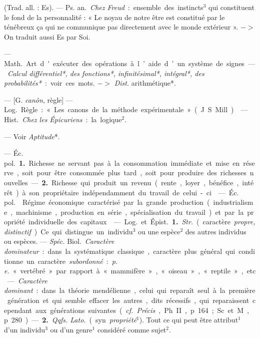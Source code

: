 
	\begin{itemize}[leftmargin=1cm, label=, itemsep=11pt]

 (Trad. all. : Es). — \si{Ps. an.} {\it Chez
Freud} : ensemble des instincts$^3$ qui
constituent le fond de la personnalité :
« Le noyau de notre être est constitué
par le ténébreux ça qui ne communique pas directement avec le
monde extérieur ». $->$ On traduit
aussi Es par Soi.

 — \si{Math.} Art d'exécuter des
opérations à l’aide d’un système de
signes. — {\it Calcul différentiel*, des
fonctions*, infinitésimal*, intégral*,
des probabilités*} : voir ces mots.
$->$ {\it Dist.} arithmétique*.

 — [G. {\it canôn}, règle] — \si{Log.}
Règle : « Les canons de la méthode
expérimentale » (J. S. Mill).

 — \si{Hist.} {\it Chez les Épicuriens} : la logique$^2$.

 — Voir {\it Aptitude}*.

 — \si{Éc. pol.} {\bf 1.} Richesse ne
servant pas à la consommation
immédiate et mise en réserve, soit
pour être consommée plus tard, soit
pour produire des richesses nouvelles. — {\bf 2.} Richesse qui produit un
revenu (rente, loyer, bénéfice, intérêt) à son propriétaire indépendamment du travail de celui-ci.

 — \si{Éc. pol.}  Régime économique caractérisé par la grande
production (industrialisme, machinisme, production en série, spécialisation
du travail) et par la propriété individuelle des capitaux.

 — \si{Log.} et \si{Épist.} {\bf 1.}  {\it Str.}
(caractère {\it propre, distinctif}). Ce qui
distingue un individu$^3$ ou une espèce$^2$
des autres individus ou espèces. —
{\it {\it Spéc.}} \si{Biol.} {\it Caractère dominateur} :
dans la systématique classique,
caractère plus général qui conditionne un caractère {\it subordonné} : {\it p. e.}
« vertébré » par rapport à « mammifère », « oiseau », « reptile », etc. —
{\it Caractère dominant} : dans la théorie
mendélienne, celui qui reparaît seul
à la première génération et qui
semble effacer les autres, dits récessifs, qui reparaissent cependant aux
générations suivantes ({\it cf.} {\it Précis},
Ph. II, p. 164; Sc. et M., p. 280). —
 {\bf 2.} {\it Qqfs.  {\it Lato.}} (syn. {\it propriété}$^1$). Tout
ce qui peut être attribut$^1$ d’un individu$^3$ ou d’un genre$^1$ considéré
comme sujet$^2$.


\end{itemize}
